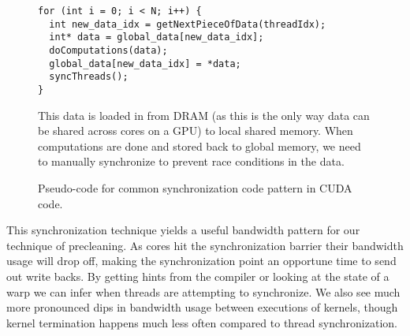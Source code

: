 \begin{figure}[htb]
\begin{center}

\begin{lstlisting}
for (int i = 0; i < N; i++) {
  int new_data_idx = getNextPieceOfData(threadIdx);
  int* data = global_data[new_data_idx];
  doComputations(data);
  global_data[new_data_idx] = *data;
  syncThreads();
}
\end{lstlisting}
\caption{Pseudo-code for common synchronization code pattern in CUDA code.} This data is loaded in from DRAM (as this is the only way data can be shared across cores on a GPU) to local shared memory. When computations are done and stored back to global memory, we need to manually synchronize to prevent race conditions in the data.
\label{f:cuda_sync}
\end{center}
\end{figure}
%


This synchronization technique yields a useful bandwidth pattern for our technique of precleaning. As cores hit the synchronization barrier their bandwidth usage will drop off, making the synchronization point an opportune time to send out write backs. By getting hints from the compiler or looking at the state of a warp we can infer when threads are attempting to synchronize. We also see much more pronounced dips in bandwidth usage between executions of kernels, though kernel termination happens much less often compared to thread synchronization.
